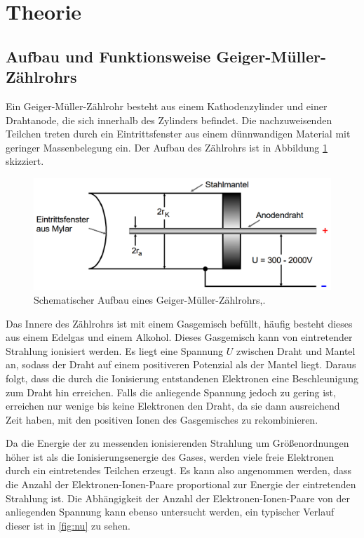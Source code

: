 \section{Theorie}
\label{sec:Theorie}
\subsection{Aufbau und Funktionsweise Geiger-Müller-Zählrohrs}
\label{subsec:theorie1}
Ein Geiger-Müller-Zählrohr besteht aus einem Kathodenzylinder und einer Drahtanode, die sich
innerhalb des Zylinders befindet. Die nachzuweisenden Teilchen treten durch ein Eintrittsfenster
aus einem dünnwandigen Material mit geringer Massenbelegung ein.
Der Aufbau des Zählrohrs ist in Abbildung \ref{fig:zaehlrohrskizze}
skizziert.

\begin{figure}
  \centering
  \includegraphics[width=\textwidth]{data/zaehlrohrskizze.png}
  \caption{Schematischer Aufbau eines Geiger-Müller-Zählrohrs,\cite{Versuchsanleitung}.}
  \label{fig:zaehlrohrskizze}
\end{figure}

Das Innere des Zählrohrs ist mit einem Gasgemisch befüllt, häufig besteht dieses aus einem Edelgas und einem Alkohol.
Dieses Gasgemisch kann von eintretender Strahlung ionisiert werden.
Es liegt eine Spannung $U$ zwischen Draht und Mantel an, sodass der Draht auf einem positiveren Potenzial als
der Mantel liegt. Daraus folgt, dass die durch die Ionisierung entstandenen Elektronen
eine Beschleunigung zum Draht hin erreichen. Falls die anliegende Spannung jedoch
zu gering ist, erreichen nur wenige bis keine Elektronen den Draht, da sie dann ausreichend
Zeit haben, mit den positiven Ionen des Gasgemisches zu rekombinieren.

Da die Energie der zu messenden ionisierenden Strahlung um Größenordnungen höher
ist als die Ionisierungsenergie des Gases, werden viele freie Elektronen durch ein eintretendes
Teilchen erzeugt. Es kann also angenommen werden, dass die Anzahl der Elektronen-Ionen-Paare
proportional zur Energie der eintretenden Strahlung ist. Die Abhängigkeit der Anzahl der Elektronen-Ionen-Paare
von der anliegenden Spannung kann ebenso untersucht werden, ein typischer
Verlauf dieser ist in \ref{fig:nu} zu sehen.

